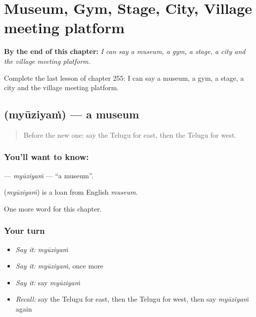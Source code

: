 
\chapter{Museum, Gym, Stage, City, Village meeting platform}
\label{ch:te-museum-gym-stage-city-village-meeting-platform}

\begin{chapteropening}
\textbf{By the end of this chapter:} \emph{I can say a museum, a gym, a stage, a city and the village meeting platform.}

Complete the last lesson of chapter 255: I can say a museum, a gym, a stage, a city and the village meeting platform.
\end{chapteropening}

\section[\texorpdfstring{\te{మ్యూజియం} (myūziyaṁ)}{మ్యూజియం (myūziyaṁ)}]{ (myūziyaṁ) — a museum}

\label{lesson:TE-C255-myuziyam}



\begin{quote}
Before the new one: say the Telugu for east, then the Telugu for west.
\end{quote}

\subsection*{You'll want to know: }
\textbf{} — \emph{myūziyaṁ} — \textquotedblleft{}a museum\textquotedblright{}.

\begin{cousinweb}
\textbf{} (\emph{myūziyaṁ}) is a loan from English \emph{museum}.
\end{cousinweb}

\begin{grammarlens}[title={What you've built}]
One more word for this chapter.
\end{grammarlens}

\subsection*{Your turn}
\begin{itemize}
\raggedright
  \item \emph{Say it:} \emph{myūziyaṁ}
  \item \emph{Say it:} \emph{myūziyaṁ}, once more
  \item \emph{Say it:} say \emph{myūziyaṁ}
  \item \emph{Recall:} say the Telugu for east, then the Telugu for west, then say \emph{myūziyaṁ} again
\end{itemize}

